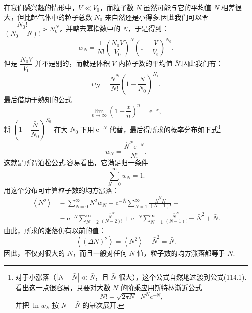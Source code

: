 在我们感兴趣的情形中，$V\ll V_{0}$，而粒子数 $N$ 虽然可能与它的平均值 $\bar{N}$ 相差很大，但比起气体中的粒子总数 $N_{0}$ 来自然还是小得多.因此我们可以令
$\dfrac{N_{0}!}{(N_{0}-N)!}\approx N_{0}^{N}$，并略去幂指数中的 $N$，于是得到：
\begin{equation*}
  w_{N}=\frac{1}{N!}\left(\frac{N_{0}V}{V_{0}}\right)^{N}
  \left(1-\frac{V}{V_{0}}\right)^{N_{0}}.
\end{equation*}
但是 $\dfrac{N_{0}V}{V_{0}}$ 并不是别的，而就是体积 $V$ 内粒子数的平均值 $\bar{N}$.因此我们有：
\begin{equation*}
  w_{N}=\frac{\bar{N}^{N}}{N!}
  \left(1-\frac{\bar{N}}{N_{0}}\right)^{N_{0}}.
\end{equation*}
最后借助于熟知的公式
\begin{equation*}
  \lim_{n\to\infty}\left(1-\frac{x}{n}\right)^{n}=\mathrm{e}^{-x},
\end{equation*}
将 $\left(1-\dfrac{\bar{N}}{N_{0}}\right)^{N_{0}}$ 在大 $N_{0}$ 下用 $\mathrm{e}^{-\bar{N}}$ 代替，最后得所求的概率分布如下式\footnote{对于小涨落（$|N-\bar{N}|\ll\bar{N}$，且 $\bar{N}$ 很大），这个公式自然地过渡到公式(114.1). 看出这一点很容易，只要对大数 $N$ 的阶乘应用斯特林渐近公式
\begin{equation*}
  N!=\sqrt{2\pi N}\cdot N^{N}\mathrm{e}^{-N},
\end{equation*}
并把 $\ln w_{N}$ 按 $N-\bar{N}$ 的幂次展开.}
\begin{equation}
  w_{N}=\frac{\bar{N}^{N}\mathrm{e}^{-\bar{N}}}{N!}.
\end{equation}
这就是所谓泊松公式.容易看出，它满足归一条件
\begin{equation*}
  \sum_{N=0}^{\infty}w_{N}=1.
\end{equation*}
用这个分布可计算粒子数的均方涨落：
\begin{equation*}
\begin{aligned}
  \left\langle N^{2}\right\rangle
  &=\sum_{N=0}^{\infty}N^{2}w_{N}
  =\mathrm{e}^{-\bar{N}}\sum_{N=1}^{\infty}
  \frac{\bar{N}^{N}N}{(N-1)!}=\\
  &=\mathrm{e}^{-\bar{N}}\sum_{N=2}^{\infty}\frac{\bar{N}^{N}}{(N-2)!}
  +\mathrm{e}^{-\bar{N}}\sum_{N=1}^{\infty}\frac{\bar{N}^{N}}{(N-1)!}
  =\bar{N}^{2}+\bar{N}.
\end{aligned}
\end{equation*}
由此，所求的涨落仍有以前的值：
\begin{equation}
  \left\langle(\Delta N)^{2}\right\rangle
  =\left\langle N^{2}\right\rangle-\bar{N}^{2}=\bar{N}.
\end{equation}
因此，不仅对很大的 $\bar{N}$，而且一般对任何 $\bar{N}$ 值，粒子数的均方涨落都等于 $\bar{N}$.

